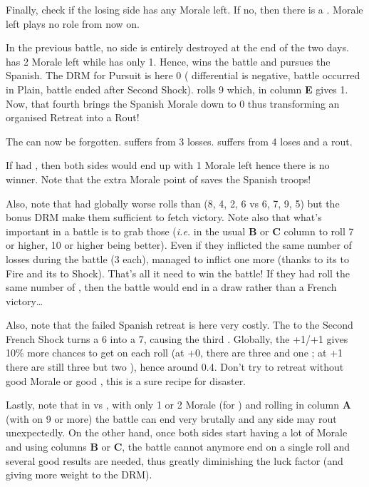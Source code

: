 Finally, check if the losing side has any Morale left. If no, then there is a
. Morale left plays no role from now on.

\begin{exemple}
  In the previous battle, no side is entirely destroyed at the end of the two
  days. \FRA has 2 Morale left while \HIS has only 1. Hence, \FRA wins the
  battle and pursues the Spanish. The DRM for Pursuit is here 0 (\Shock
  differential is negative, battle occurred in Plain, battle ended after
  Second Shock). \FRA rolls 9 which, in column \textbf{E} gives
  1\textetoile. Now, that fourth \textetoile brings the Spanish Morale down to
  0 thus transforming an organised Retreat into a Rout!

  The \textetoile can now be forgotten. \FRA suffers from 3 losses. \HIS
  suffers from 4 loses and a rout.

  \smallskip

  If \FRA had , then both sides would end up with 1 Morale
  left hence there is no winner. Note that the extra Morale point of
   saves the Spanish troops!

  \smallskip

  Also, note that \FRA had globally worse rolls than \HIS (8, 4, 2, 6 vs 6, 7,
  9, 5) but the bonus DRM make them sufficient to fetch victory. Note also
  that what's important in a battle is to grab those \textetoile (\emph{i.e.}
  in the usual \textbf{B} or \textbf{C} column to roll 7 or higher, 10 or
  higher being better). Even if they inflicted the same number of losses
  during the battle (3 each), \FRA managed to inflict one more \textetoile
  (thanks to its  to Fire and its  to Shock). That's all
  it need to win the battle! If they had roll the same number of \textetoile,
  then the battle would end in a draw rather than a French victory\ldots

  Also, note that the failed Spanish retreat is here very costly. The
   to the Second French Shock turns a 6 into a 7, causing the third
  \textetoile. Globally, the +1/+1 gives 10\% more chances to get
  \textetoile\textetoile on each roll (at +0, there are three \textetoile and
  one \textetoile\textetoile; at +1 there are still three \textetoile but two
  \textetoile\textetoile), hence around 0.4\textetoile. Don't try to retreat
  without good Morale or good \Man, this is a sure recipe for disaster.

  Lastly, note that in \TMED vs \TMED, with only 1 or 2 Morale (for
  ) and rolling in column \textbf{A} (with
  \textetoile\textetoile on 9 or more) the battle can end very brutally and
  any side may rout unexpectedly. On the other hand, once both sides start
  having a lot of Morale and using columns \textbf{B} or \textbf{C}, the
  battle cannot anymore end on a single roll and several good results are
  needed, thus greatly diminishing the luck factor (and giving more weight to
  the DRM).
\end{exemple}


